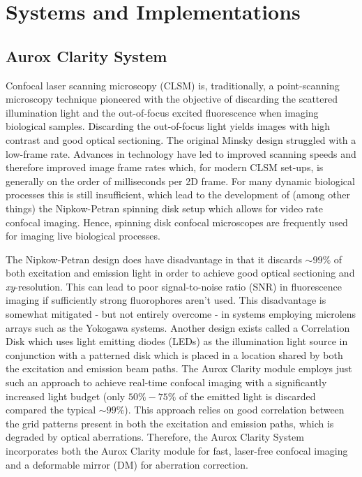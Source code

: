 \chapter{Systems and Implementations}
\label{chpt:sytems}

\section{Aurox Clarity System}
\label{sec:aurox}

Confocal laser scanning microscopy (CLSM) is, traditionally, a
point-scanning microscopy technique pioneered with the objective of
discarding the scattered illumination light and the out-of-focus
excited fluorescence when imaging biological
samples\cite{minsky1988memoir}. Discarding the out-of-focus light
yields images with high contrast and good optical
sectioning\cite{nwaneshiudu2012introduction}. The original Minsky
design struggled with a low-frame rate. Advances in technology have
led to improved scanning speeds and therefore improved image frame
rates which, for modern CLSM set-ups, is generally on the order of 
milliseconds per 2D frame\cite{schermelleh2010guide,xiao1988real}. For many 
dynamic biological processes this is still insufficient, which lead to the 
development of (among other things) the Nipkow-Petran spinning disk setup 
which allows for video rate confocal 
imaging\cite{egger1967new,fuseler2018types,tsien1995video}. Hence, spinning 
disk confocal microscopes are frequently used for imaging live biological 
processes.

The Nipkow-Petran design does have disadvantage in that it discards 
$\sim99\%$ of both excitation and emission light in order to achieve good 
optical sectioning and \textit{xy}-resolution\cite{kino1995intermediate}. 
This can lead to poor signal-to-noise ratio (SNR) in fluorescence imaging if 
sufficiently strong fluorophores aren't used\cite{semwogerere2005confocal}. 
This disadvantage is somewhat mitigated - but not entirely overcome - in 
systems employing microlens arrays such as the Yokogawa 
systems\cite{wang2005performance}. Another design exists called a Correlation 
Disk which uses light emitting diodes (LEDs) as the illumination light source 
in conjunction with a patterned disk which is placed in a location shared by 
both the excitation and emission beam 
paths\cite{juskaitis1996efficient,wilson1996confocal,neil1997method}. The 
Aurox Clarity module employs just such an approach to achieve real-time 
confocal imaging with a significantly increased light budget (only $50\%-75\%$ of the emitted light is discarded compared the typical $\sim99\%$). This approach relies on good correlation between the 
grid patterns present in both the excitation and emission paths, which is 
degraded by optical aberrations\cite{hussain2020wavefront}. Therefore, the 
Aurox Clarity System incorporates both the Aurox Clarity module for fast, 
laser-free confocal imaging and a deformable mirror (DM) for aberration 
correction.

